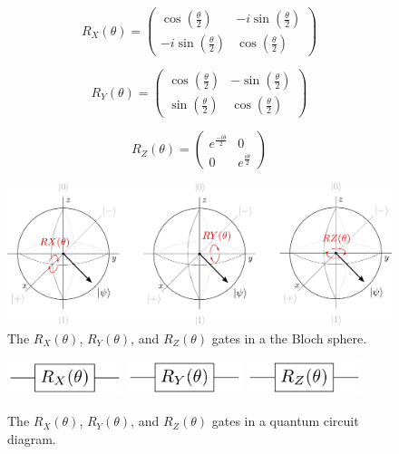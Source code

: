 \begin{linenomath}
\begin{equation}
	R_X(\theta)=\begin{pmatrix}
\cos(\frac{\theta}{2}) & -i\sin(\frac{\theta}{2}) \\
-i\sin(\frac{\theta}{2}) & \cos(\frac{\theta}{2})
\end{pmatrix} 
\label{eq:rotx}
\end{equation}
\end{linenomath}
\begin{linenomath}
\begin{equation}
	R_Y(\theta)=\begin{pmatrix}
\cos(\frac{\theta}{2}) & -\sin(\frac{\theta}{2}) \\
\sin(\frac{\theta}{2}) & \cos(\frac{\theta}{2})
\end{pmatrix}
\label{eq:roty}
\end{equation}
\end{linenomath}
\begin{linenomath}
\begin{equation}
	R_Z(\theta)=\begin{pmatrix}
e^{\frac{-i\theta}{2}} & 0 \\
0 & e^{\frac{i\theta}{2}}
\end{pmatrix}
\label{eq:rotz}
\end{equation}
\end{linenomath}

\begin{figure}[!htbp]
\centering
	\includegraphics[width=1\textwidth]{figures/rotations.pdf}
\caption{The $R_X(\theta)$, $R_Y(\theta)$, and $R_Z(\theta)$ gates in a the Bloch sphere.}
\label{fig:rots}
\end{figure}

\begin{figure}[!htbp]
\centering
	\includegraphics[width=0.30\textwidth]{figures/RX.pdf}
	\includegraphics[width=0.30\textwidth]{figures/RY.pdf}
	\includegraphics[width=0.30\textwidth]{figures/RZ.pdf}
\caption{The $R_X(\theta)$, $R_Y(\theta)$, and $R_Z(\theta)$ gates in a quantum 
circuit diagram.}
\label{fig:rotscirc}
\end{figure}

